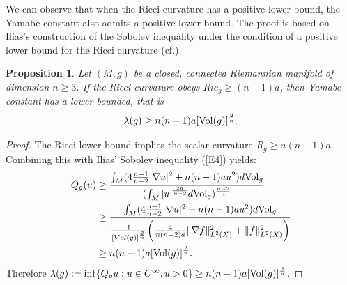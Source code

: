 \documentclass[12pt, twoside]{article}
\newtheorem{proposition}[theorem]{Proposition}
\theoremstyle{definition}
\numberwithin{equation}{section}
\def \la {\lambda}
\def\na {\nabla}
\begin{document}
We can observe that when the Ricci curvature has a positive lower bound, the Yamabe constant also admits a positive lower bound. The proof is based on Ilias's construction of the Sobolev inequality under the condition of a positive lower bound for the Ricci curvature (cf.\cite{Ili83}).
\begin{proposition}\label{P6}
	Let $(M,g)$ be a closed, connected Riemannian manifold of dimension $n\geq 3$. If the Ricci curvature obeys $Ric_{g}\geq(n-1)a$, then 	Yamabe constant has a lower bounded, that is 
	$$\la(g)\geq n(n-1)a[{\rm{Vol}}(g)]^{\frac{2}{n}}.$$
\end{proposition}
\begin{proof}
The Ricci lower bound implies the scalar curvature $R_{g}\geq n(n-1)a$. Combining this with Ilias' Sobolev inequality (\ref{E4}) yields:
	\begin{equation*}
	\begin{split}
	Q_{g}(u)&\geq \frac{\int_{M}(4\frac{n-1}{n-2}|\na u|^{2}+n(n-1)au^{2})d{\rm{Vol}}_{g}      }   { (\int_{M} |u|^{\frac{2n}{n-2}}d{\rm{Vol}}_{g})^{\frac{n-2}{n} } }\\
	&\geq \frac{\int_{M}(4\frac{n-1}{n-2}|\na u|^{2}+n(n-1)au^{2})d{\rm{Vol}}_{g}      }   { \frac{1}{[Vol(g)]^{\frac{2}{n} } }\bigg{(}\frac{4}{n(n-2)a}\|\na f\|^{2}_{L^{2}(X)}+\|f\|^{2}_{L^{2}(X)}\bigg{)}}\\
	&\geq n(n-1)a[{\rm{Vol}}(g)]^{\frac{2}{n}}. \\
	\end{split}
	\end{equation*}
	Therefore $\la(g):=\inf\{ Q_{g}u:u\in C^{\infty},u>0\}\geq n(n-1)a[{\rm{Vol}}(g)]^{\frac{2}{n}}$.
\end{proof}
\end{document}
